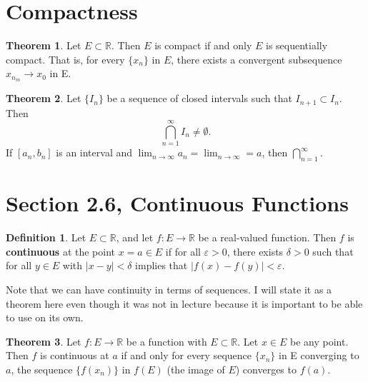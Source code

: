 \documentclass[12pt]{article}
\newcommand{\R}{\mathbb{R}}
\renewcommand{\epsilon}{\varepsilon}
\theoremstyle{definition}
\newtheorem*{thm}{Theorem}
\newtheorem*{definition}{Definition}
\begin{document}
\section*{Compactness}

\begin{thm}
    Let \(E \subset \R \). Then \( E \) is compact if and only \( E\) is sequentially compact. That is, for every \( \{ x_n \} \) in \( E \), there exists a convergent subsequence \( x_{n_{m} } \to x_0 \) in E.
\end{thm}


\begin{thm}

        Let \( \{ I_n \} \) be a sequence of closed intervals such that \( I_{n+1} \subset I_n \). Then 
            \[
                \bigcap_{n=1}^{\infty} I_n \neq \emptyset.  
            \]
        If \( [a_n, b_n] \) is an interval and \( \displaystyle\lim_{n \to \infty} a_n = \lim_{n \to \infty} = a \), then \( \displaystyle \bigcap_{n=1}^{\infty} \).
\end{thm}

\section*{Section 2.6, Continuous Functions}

\begin{definition}
    Let \( E \subset \R \), and let \( f: E \to \R \) be a real-valued function. Then \( f \) is \textbf{continuous} at the point \( x = a \in E\) if for all \( \epsilon > 0 \), there exists \( \delta > 0 \) such that for all \( y \in E \) with \( |x - y| < \delta \) implies that \( |f(x) - f(y)| < \epsilon \).
\end{definition}

Note that we can have continuity in terms of sequences. I will state it as a theorem here even though it was not in lecture because it is important to be able to use on its own.

\begin{thm}
    Let \( f: E \to \R \) be a function with \( E \subset \R \). Let \( x \in E \) be any point. Then \( f \) is continuous at \( a \) if and only for every sequence \( \{x_n\} \) in E converging to \( a\), the sequence \( \{ f(x_n) \} \) in \( f(E) \) (the image of \( E\)) converges to \( f(a) \).
\end{thm}
\end{document}
